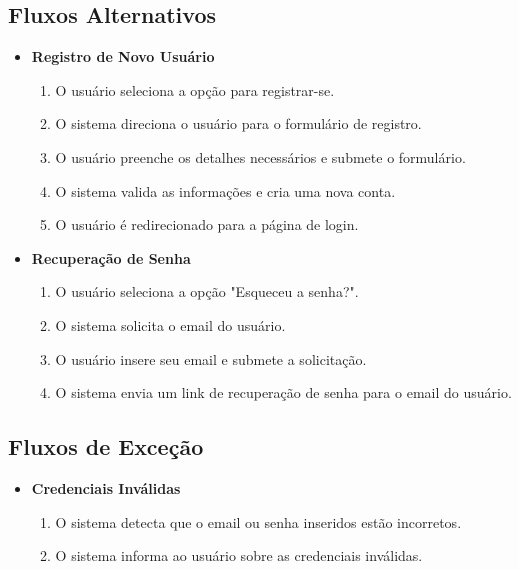 \subsection*{Fluxos Alternativos}
\begin{addmargin}[1.5cm]{0cm}
	\begin{itemize}
		\item \textbf{Registro de Novo Usuário}
		      \begin{enumerate}
		      	\item O usuário seleciona a opção para registrar-se.
		      	\item O sistema direciona o usuário para o formulário de registro.
		      	\item O usuário preenche os detalhes necessários e submete o formulário.
		      	\item O sistema valida as informações e cria uma nova conta.
		      	\item O usuário é redirecionado para a página de login.
		      \end{enumerate}
		          
		\item \textbf{Recuperação de Senha}
		      \begin{enumerate}
		      	\item O usuário seleciona a opção "Esqueceu a senha?".
		      	\item O sistema solicita o email do usuário.
		      	\item O usuário insere seu email e submete a solicitação.
		      	\item O sistema envia um link de recuperação de senha para o email do usuário.
		      \end{enumerate}
	\end{itemize}
\end{addmargin}

\subsection*{Fluxos de Exceção}
\begin{addmargin}[1.5cm]{0cm}
	\begin{itemize}
		\item \textbf{Credenciais Inválidas}
		      \begin{enumerate}
		      	\item O sistema detecta que o email ou senha inseridos estão incorretos.
		      	\item O sistema informa ao usuário sobre as credenciais inválidas.
		      \end{enumerate}
	\end{itemize}
\end{addmargin}

